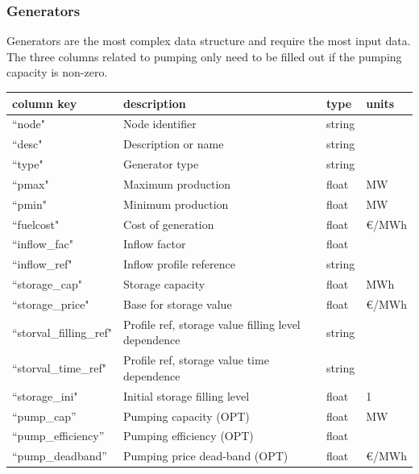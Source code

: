 \documentclass{article}
\begin{document}
\subsubsection{Generators}
Generators are the most complex data structure and require the most input data.
The three columns related to pumping only need to be filled out if the pumping capacity is non-zero.

\medskip
\begin{tabular}{llll}
	\hline
	 column key & description & type & units \\
	\hline
	``node"			& Node identifier 		& string	& \\
	``desc"			& Description or name	& string	& \\
	``type"			& Generator type		& string	& \\
	``pmax"			& Maximum production 	& float	& MW \\
	``pmin"			& Minimum production	& float	& MW \\
	``fuelcost"		& Cost of generation		& float	& €/MWh \\
	``inflow\_fac"	& Inflow factor			& float	&  \\
	``inflow\_ref"		& Inflow profile reference	& string & \\
	``storage\_cap"	& Storage capacity		& float	& MWh \\
	``storage\_price"			& Base for storage value	& float	& €/MWh \\
	``storval\_filling\_ref"	& Profile ref, storage value filling level dependence 	& string & \\
	``storval\_time\_ref"	& Profile ref, storage value time dependence 	& string & \\
	``storage\_ini"		& Initial storage filling level	& float	& 1 \\
	``pump\_cap''		& Pumping capacity (OPT)	& float		& MW \\
	``pump\_efficiency''	& Pumping efficiency (OPT) & float	& \\
	``pump\_deadband''	& Pumping price dead-band (OPT)  & float & €/MWh \\
	\hline
\end{tabular}
\end{document}
